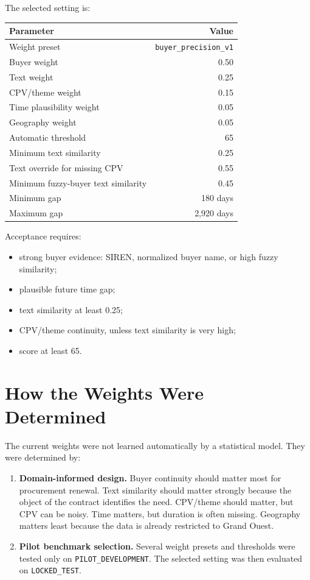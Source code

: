 \documentclass[11pt,a4paper]{article}
\newcommand{\code}[1]{\texttt{#1}}
\begin{document}
The selected setting is:

\begin{center}
\small
\begin{tabularx}{0.82\textwidth}{Xr}
\toprule
Parameter & Value \\
\midrule
Weight preset & \code{buyer\_precision\_v1} \\
Buyer weight & 0.50 \\
Text weight & 0.25 \\
CPV/theme weight & 0.15 \\
Time plausibility weight & 0.05 \\
Geography weight & 0.05 \\
Automatic threshold & 65 \\
Minimum text similarity & 0.25 \\
Text override for missing CPV & 0.55 \\
Minimum fuzzy-buyer text similarity & 0.45 \\
Minimum gap & 180 days \\
Maximum gap & 2,920 days \\
\bottomrule
\end{tabularx}
\end{center}

Acceptance requires:

\begin{itemize}
  \item strong buyer evidence: SIREN, normalized buyer name, or high fuzzy similarity;
  \item plausible future time gap;
  \item text similarity at least 0.25;
  \item CPV/theme continuity, unless text similarity is very high;
  \item score at least 65.
\end{itemize}

\section*{How the Weights Were Determined}

The current weights were not learned automatically by a statistical model. They were determined by:

\begin{enumerate}
  \item \textbf{Domain-informed design.} Buyer continuity should matter most for procurement renewal. Text similarity should matter strongly because the object of the contract identifies the need. CPV/theme should matter, but CPV can be noisy. Time matters, but duration is often missing. Geography matters least because the data is already restricted to Grand Ouest.
  \item \textbf{Pilot benchmark selection.} Several weight presets and thresholds were tested only on \code{PILOT\_DEVELOPMENT}. The selected setting was then evaluated on \code{LOCKED\_TEST}.
\end{enumerate}
\end{document}
